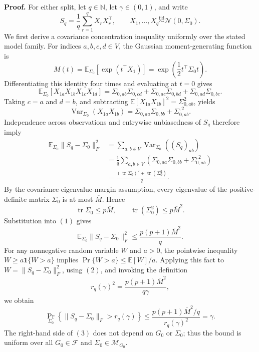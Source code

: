 \textbf{Proof.}
For either split, let \(q\in\mathbb N\), let \(\gamma\in(0,1)\), and write
\[
 S_q=\frac1q\sum_{r=1}^q X_rX_r^\top,
 \qquad X_1,\ldots,X_q\stackrel{\mathrm{iid}}{\sim}\mathcal N(0,\Sigma_0).
\]
We first derive a covariance concentration inequality uniformly over the stated model family.  For indices \(a,b,c,d\in V\), the Gaussian moment-generating function is
\[
 M(t)=\mathbb E_{\Sigma_0}\!\left[\exp(t^\top X_1)\right]
     =\exp\!\left(\frac12t^\top\Sigma_0t\right).
\]
Differentiating this identity four times and evaluating at \(t=0\) gives
\[
 \mathbb E_{\Sigma_0}[X_{1a}X_{1b}X_{1c}X_{1d}]
 =\Sigma_{0,ab}\Sigma_{0,cd}
  +\Sigma_{0,ac}\Sigma_{0,bd}
  +\Sigma_{0,ad}\Sigma_{0,bc}.
\]
Taking \(c=a\) and \(d=b\), and subtracting
\(\mathbb E[X_{1a}X_{1b}]^2=\Sigma_{0,ab}^2\), yields
\[
 \operatorname{Var}_{\Sigma_0}(X_{1a}X_{1b})
 =\Sigma_{0,aa}\Sigma_{0,bb}+\Sigma_{0,ab}^{,2}.
\]
Independence across observations and entrywise unbiasedness of \(S_q\) therefore imply
\[
\begin{aligned}
 \mathbb E_{\Sigma_0}\|S_q-\Sigma_0\|_F^2
 &=\sum_{a,b\in V}\operatorname{Var}_{\Sigma_0}((S_q)_{ab})\\
 &=\frac1q\sum_{a,b\in V}
   \left(\Sigma_{0,aa}\Sigma_{0,bb}+\Sigma_{0,ab}^{,2}\right)\\
 &=\frac{(\operatorname{tr}\Sigma_0)^2+\operatorname{tr}(\Sigma_0^2)}q.
\end{aligned}
\tag{1}
\]
By the covariance-eigenvalue-margin assumption, every eigenvalue of the positive-definite matrix \(\Sigma_0\) is at most \(\overline M\).  Hence
\[
 \operatorname{tr}\Sigma_0\le p\overline M,
 \qquad
 \operatorname{tr}(\Sigma_0^2)\le p\overline M^2.
\]
Substitution into \((1)\) gives
\[
 \mathbb E_{\Sigma_0}\|S_q-\Sigma_0\|_F^2
 \le \frac{p(p+1)\overline M^2}{q}.
\tag{2}
\]
For any nonnegative random variable \(W\) and \(a>0\), the pointwise inequality
\(W\ge a\mathbf 1\{W>a\}\) implies
\(\Pr\{W>a\}\le \mathbb E[W]/a\).  Applying this fact to
\(W=\|S_q-\Sigma_0\|_F^2\), using \((2)\), and invoking the definition
\[
 r_q(\gamma)^2=\frac{p(p+1)\overline M^2}{q\gamma},
\]
we obtain
\[
 \Pr_{\Sigma_0}\!\left\{\|S_q-\Sigma_0\|_F>r_q(\gamma)\right\}
 \le
 \frac{p(p+1)\overline M^2/q}{r_q(\gamma)^2}
 =\gamma.
\tag{3}
\]
The right-hand side of \((3)\) does not depend on \(G_0\) or \(\Sigma_0\); thus the bound is uniform over all \(G_0\in\mathcal F\) and \(\Sigma_0\in\mathcal M_{G_0}\).

